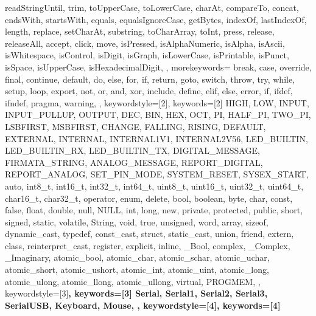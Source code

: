 {{  							readStringUntil, trim, toUpperCase, toLowerCase, charAt, compareTo, 
  							concat, endsWith, startsWith, equals, equalsIgnoreCase, getBytes, 
  							indexOf, lastIndexOf, length, replace, setCharAt, substring, 
  							toCharArray, toInt, press, release, releaseAll, accept, click, move, 
  							isPressed, isAlphaNumeric, isAlpha, isAscii, isWhitespace, isControl, 
  							isDigit, isGraph, isLowerCase, isPrintable, isPunct, isSpace, 
  							isUpperCase, isHexadecimalDigit, 
								}, 
	morekeywords={   %
								break, case, override, final, continue, default, do, else, for, 
								if, return, goto, switch, throw, try, while, setup, loop, export, 
								not, or, and, xor, include, define, elif, else, error, if, ifdef, 
								ifndef, pragma, warning,
								}, 
% 
%
  keywordstyle=[2]\color{arduinoBlue},   
  keywords=[2]{   %
  							HIGH, LOW, INPUT, INPUT_PULLUP, OUTPUT, DEC, BIN, HEX, OCT, PI, 
  							HALF_PI, TWO_PI, LSBFIRST, MSBFIRST, CHANGE, FALLING, RISING, 
  							DEFAULT, EXTERNAL, INTERNAL, INTERNAL1V1, INTERNAL2V56, LED_BUILTIN, 
  							LED_BUILTIN_RX, LED_BUILTIN_TX, DIGITAL_MESSAGE, FIRMATA_STRING, 
  							ANALOG_MESSAGE, REPORT_DIGITAL, REPORT_ANALOG, SET_PIN_MODE, 
  							SYSTEM_RESET, SYSEX_START, auto, int8_t, int16_t, int32_t, int64_t, 
  							uint8_t, uint16_t, uint32_t, uint64_t, char16_t, char32_t, operator, 
  							enum, delete, bool, boolean, byte, char, const, false, float, double, 
  							null, NULL, int, long, new, private, protected, public, short, 
  							signed, static, volatile, String, void, true, unsigned, word, array, 
  							sizeof, dynamic_cast, typedef, const_cast, struct, static_cast, union, 
  							friend, extern, class, reinterpret_cast, register, explicit, inline, 
  							_Bool, complex, _Complex, _Imaginary, atomic_bool, atomic_char, 
  							atomic_schar, atomic_uchar, atomic_short, atomic_ushort, atomic_int, 
  							atomic_uint, atomic_long, atomic_ulong, atomic_llong, atomic_ullong, 
  							virtual, PROGMEM,
  							},	
% 
%
  keywordstyle=[3]\bfseries\color{arduinoOrange},
  keywords=[3]{  %
  							Serial, Serial1, Serial2, Serial3, SerialUSB, Keyboard, Mouse,
  							},			
%
%
  keywordstyle=[4]\color{arduinoOrange},
  keywords=[4]{  %
}}
